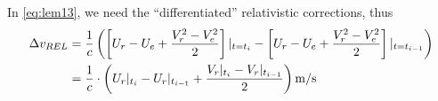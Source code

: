 In \ref{eq:lem13}, we need the ``differentiated'' relativistic corrections, thus 
\begin{equation}
  \label{eq:drel-diff}
  \begin{aligned}
    \Delta v_{REL} &= \frac{1}{c} \left( \left[ U_r - U_e + \frac{V^2_r - V^2_e}{2} \right]\at{t=t_i} - \left[ U_r - U_e + \frac{V^2_r - V^2_e}{2} \right]\at{t=t_{i-1}} \right) \\
      &= \frac{1}{c} \cdot \left( U_r\at{t_i} - U_r\at{t_{i-1}} +  \frac{V_r\at{t_i}-V_r\at{t_{i-1}}}{2} \right) \si{\m\per\s}
  \end{aligned}
\end{equation}